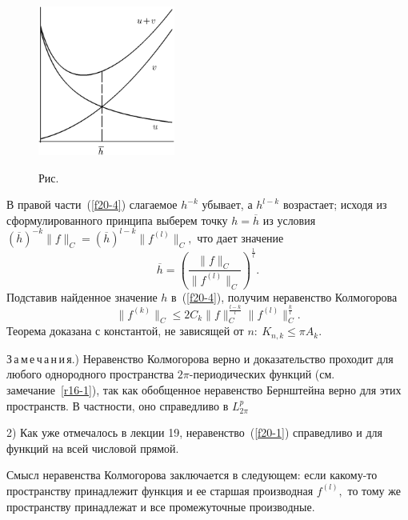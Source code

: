 
\begin{figure}[ht]
\begin{center}
\includegraphics[width=0.4\textwidth]{pict20-1.eps}
\end{center}
 \bigskip
 \label{r20-1}

 \centerline{Рис.~\theris}
 \bigskip
\end{figure}


В правой части~(\ref{f20-4}) слагаемое  $h^{-k}$ убывает, а $h^{l-k}$
возрастает; исходя из сформулированного принципа выберем точку
 $h=\overline h$ из
 условия $(\overline h)^{-k}\|f\|_C=(\overline h)^{l-k}\|f^{(l)}\|_C,$ что дает значение
 $$
  \overline h=\left( \frac{\|f\|_C}{\|f^{(l)}\|_C}\right)^{\frac{1}{l}}.
 $$
 Подставив найденное значение $h$
 в~(\ref{f20-4}), получим неравенство Колмогорова
 $$
 \|f^{(k)}\|_C\le {2C_k}\|f\|_C^{\frac{l-k}{l}}\|f^{(l)}\|_C^{\frac{k}{l}}.
 $$
 Теорема доказана с константой, не зависящей от $n:\ K_{n,k}\le \pi A_k.$

 З\,а\,м\,е\,ч\,а\,н\,и\,я.) Неравенство Колмогорова верно   и доказательство проходит
 для любого однородного пространства
 $2\pi$-периодических функций (см. замечание~\ref{r16-1}), так как
 обобщенное неравенство Бернштейна верно для этих
 пространств. В частности, оно справедливо в $L_{2\pi}^p$

 2) Как уже отмечалось в лекции 19, неравенство~(\ref{f20-1}) справедливо и для функций на всей
 числовой прямой.


 Смысл неравенства Колмогорова заключается в
 следующем: если какому-то пространству принадлежит
 функция и ее старшая производная $f^{(l)},$
 то тому же пространству принадлежат и все промежуточные
 производные.

